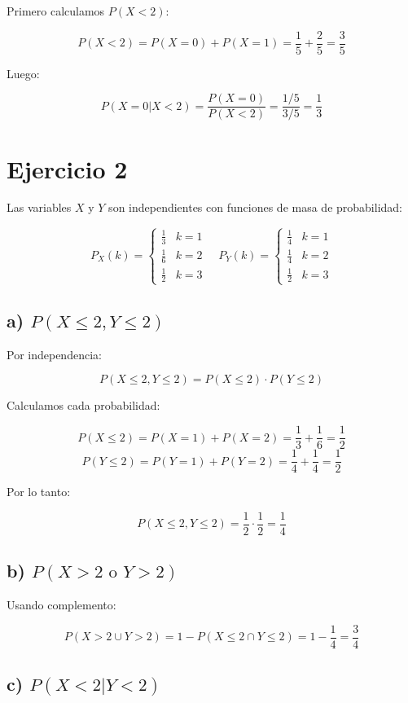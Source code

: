 \documentclass{article}
\begin{document}
Primero calculamos \(P(X < 2)\):

\[
P(X < 2) = P(X = 0) + P(X = 1) = \frac{1}{5} + \frac{2}{5} = \frac{3}{5}
\]

Luego:

\[
P(X = 0|X < 2) = \frac{P(X = 0)}{P(X < 2)} = \frac{1/5}{3/5} = \frac{1}{3}
\]

\section*{Ejercicio 2}

Las variables \(X\) y \(Y\) son independientes con funciones de masa de probabilidad:

\[
P_X(k) = \begin{cases} 
\frac{1}{3} & k = 1 \\ 
\frac{1}{6} & k = 2 \\ 
\frac{1}{2} & k = 3 
\end{cases}
\quad
P_Y(k) = \begin{cases} 
\frac{1}{4} & k = 1 \\ 
\frac{1}{4} & k = 2 \\ 
\frac{1}{2} & k = 3 
\end{cases}
\]

\subsection*{a) \(P(X \leq 2, Y \leq 2)\)}

Por independencia:

\[
P(X \leq 2, Y \leq 2) = P(X \leq 2) \cdot P(Y \leq 2)
\]

Calculamos cada probabilidad:

\[
P(X \leq 2) = P(X = 1) + P(X = 2) = \frac{1}{3} + \frac{1}{6} = \frac{1}{2}
\]
\[
P(Y \leq 2) = P(Y = 1) + P(Y = 2) = \frac{1}{4} + \frac{1}{4} = \frac{1}{2}
\]

Por lo tanto:

\[
P(X \leq 2, Y \leq 2) = \frac{1}{2} \cdot \frac{1}{2} = \frac{1}{4}
\]

\subsection*{b) \(P(X > 2 \text{ o } Y > 2)\)}

Usando complemento:

\[
P(X > 2 \cup Y > 2) = 1 - P(X \leq 2 \cap Y \leq 2) = 1 - \frac{1}{4} = \frac{3}{4}
\]

\subsection*{c) \(P(X < 2 | Y < 2)\)}
\end{document}
